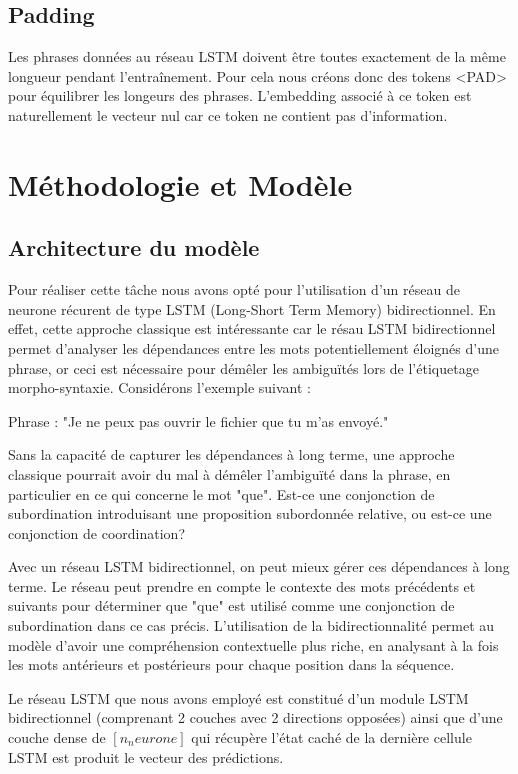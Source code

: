 \documentclass[a4paper]{article}
\begin{document}
\subsection{Padding}

Les phrases données au réseau LSTM doivent être toutes exactement de la même longueur pendant l'entraînement. 
Pour cela nous créons donc des tokens <PAD> pour équilibrer les longeurs des phrases. L'embedding associé à ce 
token est naturellement le vecteur nul car ce token ne contient pas d'information. 


\section{Méthodologie et Modèle}


\subsection{Architecture du modèle}
Pour réaliser cette tâche nous avons opté pour l'utilisation d'un réseau de neurone récurent de type LSTM 
(Long-Short Term Memory) bidirectionnel. En effet, cette approche classique est intéressante car le résau 
LSTM bidirectionnel permet d'analyser les dépendances entre les mots potentiellement éloignés d'une phrase, 
or ceci est nécessaire pour démêler les ambiguïtés lors de l'étiquetage morpho-syntaxie. Considérons l'exemple 
suivant :

Phrase : "Je ne peux pas ouvrir le fichier que tu m'as envoyé."

Sans la capacité de capturer les dépendances à long terme, une approche classique pourrait avoir du mal à 
démêler l'ambiguïté dans la phrase, en particulier en ce qui concerne le mot "que". Est-ce une conjonction 
de subordination introduisant une proposition subordonnée relative, ou est-ce une conjonction de coordination?

Avec un réseau LSTM bidirectionnel, on peut mieux gérer ces dépendances à long terme. Le réseau peut prendre 
en compte le contexte des mots précédents et suivants pour déterminer que "que" est utilisé comme une 
conjonction de subordination dans ce cas précis. L'utilisation de la bidirectionnalité permet au modèle 
d'avoir une compréhension contextuelle plus riche, en analysant à la fois les mots antérieurs et postérieurs 
pour chaque position dans la séquence. 

Le réseau LSTM que nous avons employé est constitué d'un module LSTM bidirectionnel (comprenant 2 couches avec 
2 directions opposées) ainsi que d'une couche dense de $[n_neurone]$ qui récupère l'état caché de la dernière 
cellule LSTM est produit le vecteur des prédictions. 
\end{document}
